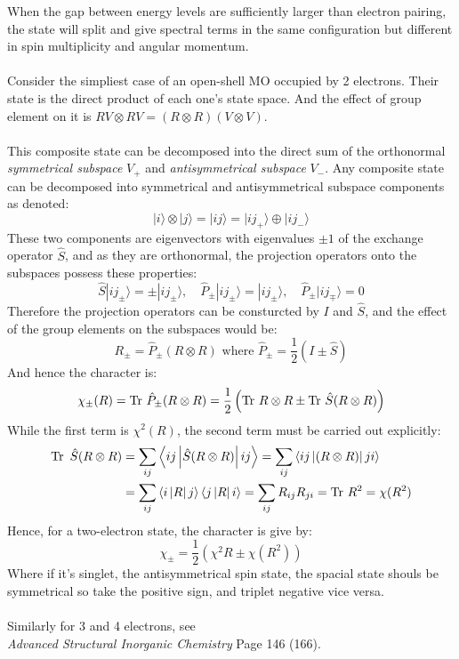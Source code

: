 	When the gap between energy levels are sufficiently larger than electron pairing, 
	the state will split and give spectral terms in the same configuration but different in spin multiplicity and angular momentum.\\\ \\
	Consider the simpliest case of an open-shell MO occupied by 2 electrons. Their state is the direct product of each one's state space.
	And the effect of group element on it is $RV \otimes RV = (R\otimes R)(V\otimes V)$.\\\ \\
	This composite state can be decomposed into the direct sum of the orthonormal 
	\emph{symmetrical subspace} $V_+$ and \emph{antisymmetrical subspace} $V_-$. 
	Any composite state can be decomposed into symmetrical and antisymmetrical subspace components as denoted:
	\[|i\rangle \otimes |j\rangle = |ij\rangle = |ij_+\rangle \oplus |ij_-\rangle\]
	These two components are eigenvectors with eigenvalues $\pm1$ of the exchange operator $\hat{S}$, 
	and as they are orthonormal, the projection operators onto the subspaces possess these properties:
	\[\hat{S}|ij_\pm\rangle = \pm|ij_\pm\rangle, \quad \hat{P}_\pm|ij_\pm\rangle = |ij_\pm\rangle, \quad \hat{P}_\pm|ij_\mp\rangle = 0\]
	Therefore the projection operators can be consturcted by $I$ and $\hat{S}$, 
	and the effect of the group elements on the subspaces would be:
	\[R_\pm = \hat{P}_\pm(R\otimes R) \text{\ \ where\ \ } \hat{P}_\pm = \frac{1}{2}(I \pm \hat{S})\]
	And hence the character is:
	\[\chi_\pm(R) = \Tr\, \hat{P}_\pm(R\otimes R) = \frac{1}{2}\left( \Tr\, R\otimes R \pm \Tr\, \hat{S}(R\otimes R)\right)\]
	While the first term is $\chi^2(R)$, the second term must be carried out explicitly:
	\[\begin{aligned}
		\Tr\ \hat{S}(R\otimes R) & =\sum_{ij}\left\langle ij \left| \hat{S}(R\otimes R) \right| ij \right\rangle
		= \sum_{ij}\left\langle ij \left| (R\otimes R) \right| ji \right\rangle \\
		& = \sum_{ij}\left\langle i \left| R \right| j \right\rangle\left\langle j \left| R \right| i \right\rangle
		=\sum_{ij}R_{ij}R_{ji} = \Tr\, R^2 = \chi(R^2)
	\end{aligned}\]
	Hence, for a two-electron state, the character is give by:
	\[\boxed{\chi_{\pm} = \frac{1}{2}\left(\chi^2{R} \pm \chi(R^2)\right)}\]
	Where if it's singlet, the antisymmetrical spin state, the spacial state shouls be symmetrical so take the positive sign, 
	and triplet negative vice versa.\\\ \\
	Similarly for 3 and 4 electrons, see \\\emph{Advanced Structural Inorganic Chemistry} Page 146 (166).\\
	
